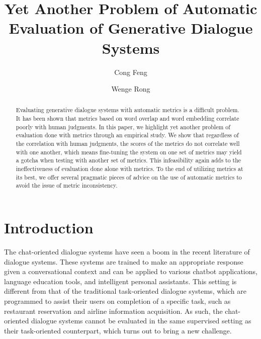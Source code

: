 \documentclass[runningheads]{llncs}
\begin{document}
    \title{Yet Another Problem of Automatic Evaluation of Generative Dialogue Systems}


    \author{Cong Feng \and Wenge Rong}



    \maketitle

    \begin{abstract}
        Evaluating generative dialogue systems with automatic metrics is a difficult problem. It has been shown that metrics based on word overlap and word embedding correlate poorly with human judgments. In this paper, we highlight yet another problem of evaluation done with metrics through an empirical study. We show that regardless of the correlation with human judgments, the scores of the metrics do not correlate well with one another, which means fine-tuning the system on one set of metrics may yield a gotcha when testing with another set of metrics. This infeasibility again adds to the ineffectiveness of evaluation done alone with metrics. To the end of utilizing metrics at its best, we offer several pragmatic pieces of advice on the use of automatic metrics to avoid the issue of metric inconsistency.
    \end{abstract}


    \section{Introduction}
    The chat-oriented dialogue systems have seen a boom in the recent literature of dialogue systems. These systems are trained to make an appropriate response given a conversational context and can be applied to various chatbot applications, language education tools, and intelligent personal assistants. This setting is different from that of the traditional task-oriented dialogue systems, which are programmed to assist their users on completion of a specific task, such as restaurant reservation and airline information acquisition. As such, the chat-oriented dialogue systems cannot be evaluated in the same supervised setting as their task-oriented counterpart, which turns out to bring a new challenge.
\end{document}
